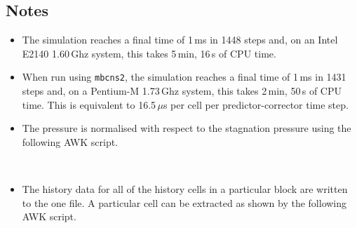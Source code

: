 \noindent
\topbar

\bottombar

\noindent
\topbar
{}
\bottombar

\newpage
\subsection{Notes}
\begin{itemize}
\item The simulation reaches a final time of 1\,ms in 1448 steps and,
      on an Intel E2140 1.60\,Ghz system, this takes 5\,min, 16\,s of CPU time.
\item When run using \texttt{mbcns2}, the simulation reaches a final time of 1\,ms in 1431 steps and,
      on a Pentium-M 1.73\,Ghz system, this takes 2\,min, 50\,s of CPU time.
      This is equivalent to 16.5\,$\mu$s per cell per predictor-corrector
      time step.
\item The pressure is normalised with respect to the stagnation pressure
      using the following AWK script.\\
      \topbarshort
      
      \bottombarshort\\
\item The history data for all of the history cells in a particular block are
      written to the one file.
      A particular cell can be extracted as shown by the following AWK script.\\
      \topbarshort
      
      \bottombarshort\\
\end{itemize}
